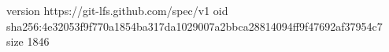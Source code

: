 version https://git-lfs.github.com/spec/v1
oid sha256:4e32053f9f770a1854ba317da1029007a2bbca28814094ff9f47692af37954c7
size 1846
